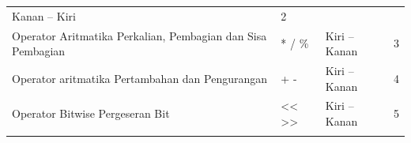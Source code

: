 \begin{longtable}[]{@{}llll@{}}
\begin{minipage}[t]{0.14\columnwidth}\raggedright\strut
Kanan -- Kiri
\strut\end{minipage} &
\begin{minipage}[t]{0.05\columnwidth}\raggedright\strut
2
\strut\end{minipage}\tabularnewline
\begin{minipage}[t]{0.52\columnwidth}\raggedright\strut
Operator Aritmatika Perkalian, Pembagian dan Sisa Pembagian
\strut\end{minipage} &
\begin{minipage}[t]{0.17\columnwidth}\raggedright\strut
* / \%
\strut\end{minipage} &
\begin{minipage}[t]{0.14\columnwidth}\raggedright\strut
Kiri -- Kanan
\strut\end{minipage} &
\begin{minipage}[t]{0.05\columnwidth}\raggedright\strut
3
\strut\end{minipage}\tabularnewline
\begin{minipage}[t]{0.52\columnwidth}\raggedright\strut
Operator aritmatika Pertambahan dan Pengurangan
\strut\end{minipage} &
\begin{minipage}[t]{0.17\columnwidth}\raggedright\strut
+ -
\strut\end{minipage} &
\begin{minipage}[t]{0.14\columnwidth}\raggedright\strut
Kiri -- Kanan
\strut\end{minipage} &
\begin{minipage}[t]{0.05\columnwidth}\raggedright\strut
4
\strut\end{minipage}\tabularnewline
\begin{minipage}[t]{0.52\columnwidth}\raggedright\strut
Operator Bitwise Pergeseran Bit
\strut\end{minipage} &
\begin{minipage}[t]{0.17\columnwidth}\raggedright\strut
\textless{}\textless{} \textgreater{}\textgreater{}
\strut\end{minipage} &
\begin{minipage}[t]{0.14\columnwidth}\raggedright\strut
Kiri -- Kanan
\strut\end{minipage} &
\begin{minipage}[t]{0.05\columnwidth}\raggedright\strut
5
\strut\end{minipage}\tabularnewline
\begin{minipage}[t]{0.52\columnwidth}\raggedright\strut

\end{minipage}
\end{longtable}
